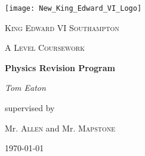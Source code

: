 \centering
\texttt{[image: New\_King\_Edward\_VI\_Logo]}\par\vspace{1cm}
{\scshape\LARGE King Edward VI Southampton\par}
\vspace{1cm}
{\scshape\Large A Level Coursework\par}
\vspace{1.5cm}
{\huge\bfseries Physics Revision Program\par}
\vspace{2cm}
{\Large\itshape Tom Eaton\par}
\vfill
supervised by\par
Mr. \textsc{Allen} and Mr. \textsc{Mapstone}

\vfill	
{\large \today\par}
